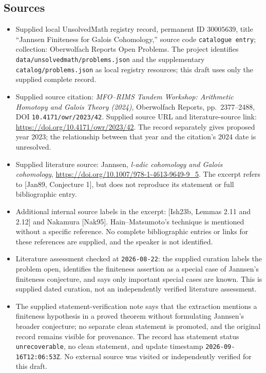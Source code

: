 \documentclass[11pt]{article}
\begin{document}
\subsection{Sources}
\begin{itemize}
\item Supplied local UnsolvedMath registry record, permanent ID \(30005639\), title ``Jannsen Finiteness for Galois Cohomology,'' source code \texttt{catalogue entry}; collection: Oberwolfach Reports Open Problems. The project identifies \texttt{data/unsolvedmath/problems.json} and the supplementary \texttt{catalog/problems.json} as local registry resources; this draft uses only the supplied complete record.
\item Supplied source citation: \emph{MFO--RIMS Tandem Workshop: Arithmetic Homotopy and Galois Theory (2024)}, Oberwolfach Reports, pp.\ 2377--2488, DOI \texttt{10.4171/owr/2023/42}. Supplied source URL and literature-source link: \url{https://doi.org/10.4171/owr/2023/42}. The record separately gives proposed year 2023; the relationship between that year and the citation's 2024 date is unresolved.
\item Supplied literature source: Jannsen, \emph{l-adic cohomology and Galois cohomology}, \url{https://doi.org/10.1007/978-1-4613-9649-9_5}. The excerpt refers to [Jan89, Conjecture 1], but does not reproduce its statement or full bibliographic entry.
\item Additional internal source labels in the excerpt: [Ish23b, Lemmas 2.11 and 2.12] and Nakamura [Nak95]. Hain--Matsumoto's technique is mentioned without a specific reference. No complete bibliographic entries or links for these references are supplied, and the speaker is not identified.
\item Literature assessment checked at \texttt{2026-08-22}: the supplied curation labels the problem open, identifies the finiteness assertion as a special case of Jannsen's finiteness conjecture, and says only important special cases are known. This is supplied dated curation, not an independently verified literature assessment.
\item The supplied statement-verification note says that the extraction mentions a finiteness hypothesis in a proved theorem without formulating Jannsen's broader conjecture; no separate clean statement is promoted, and the original record remains visible for provenance. The record has statement status \texttt{unrecoverable}, no clean statement, and update timestamp \texttt{2026-09-16T12:06:53Z}. No external source was visited or independently verified for this draft.
\end{itemize}
\end{document}
